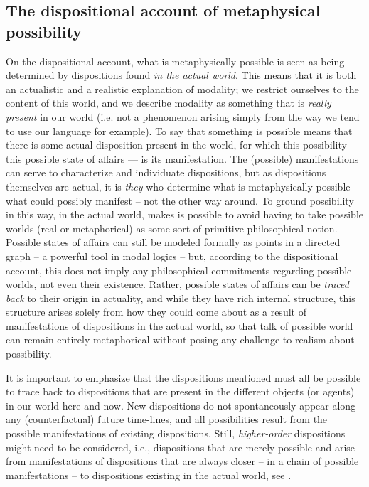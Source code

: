 \documentclass{article}
\begin{document}
\subsection*{The dispositional account of metaphysical possibility}

On the dispositional account, what is metaphysically possible is seen as being determined by dispositions found \emph{in the actual world}. This means that it is both an actualistic and a realistic explanation of modality; we restrict ourselves to the content of this world, and we describe modality as something that is \emph{really present} in our world (i.e. not a phenomenon arising simply from the way we tend to use our language for example). To say that something is possible means that there is some actual disposition present in the world, for which this possibility --- this possible state of affairs --- is its manifestation. The (possible) manifestations can serve to characterize and individuate dispositions, but as dispositions themselves are actual, it is \emph{they} who determine what is metaphysically possible -- what could possibly manifest -- not the other way around. To ground possibility in this way, in the actual world, makes is possible to avoid having to take possible worlds (real or metaphorical) as some sort of primitive philosophical notion. Possible states of affairs can still be modeled formally as points in a directed graph -- a powerful tool in modal logics -- but, according to the dispositional account, this does not imply any philosophical commitments regarding possible worlds, not even their existence. Rather, possible states of affairs can be \emph{traced back} to their origin in actuality, and while they have rich internal structure, this structure arises solely from how they could come about as a result of manifestations of dispositions in the actual world, so that talk of possible world can remain entirely metaphorical without posing any challenge to realism about possibility.

It is important to emphasize that the dispositions mentioned must all be possible to trace back to dispositions that are present in the different objects (or agents) in our world here and now. New dispositions do not spontaneously appear along any (counterfactual) future time-lines, and all possibilities result from the possible manifestations of existing dispositions. Still, \emph{higher-order} dispositions might need to be considered, i.e., dispositions that are merely possible and arise from manifestations of dispositions that are always closer -- in a chain of possible manifestations -- to dispositions existing in the actual world, see \cite{dispmod}.
\end{document}
